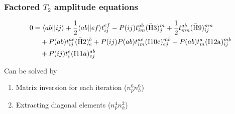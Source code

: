 \begin{frame}
    \frametitle{Factored $T_2$ amplitude equations}

\begin{align*}
    0 &= \langle ab| |ij\rangle
        + \frac{1}{2} \langle ab||ef\rangle t_{ij}^{ef}
        - P(ij) t_{im}^{ab} (\mathrm{\bar{H}3})_j^m
        + \frac{1}{2} t_{mn}^{ab} (\mathrm{\bar{H}9})_{ij}^{mn} \\
        & \quad + P(ab) t_{ij}^{ae} (\mathrm{\bar{H}2})_e^b
        + P(ij) P(ab) t_{im}^{ae} (\mathrm{I10c})_{ej}^{mb}
        - P(ab) t_m^a (\mathrm{I12a})_{ij}^{mb} \\
        & \quad + P(ij)t_i^e (\mathrm{I}11a)_{ej}^{ab} 
\end{align*}

Can be solved by
\begin{enumerate}
\item Matrix inversion for each iteration ($n_p^6 n_h^6$)
\item Extracting diagonal elements ($n_p^4 n_h^2$)
\end{enumerate}
\end{frame}

